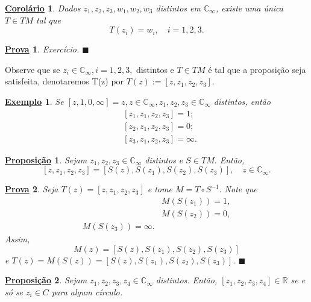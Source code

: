 \documentclass{article}
\newtheorem{example}{\underline{Exemplo}}[section]
\newtheorem*{proof*}{\underline{Prova}}
\newtheorem*{prop*}{\underline{Proposi\c c\~ao}}
\newtheorem*{crl*}{\underline{Corol\'ario}}
\renewcommand\qedsymbol{$\blacksquare$}
\begin{document}
 \begin{crl*}
   Dados $z_1, z_2, z_3, w_1, w_2, w_3$ distintos em $\mathbb{C}_{\infty}$, existe uma \'unica $T\in{TM}$ tal que
  $$
  T(z_{i}) = w_{i}, \quad i=1, 2, 3.
  $$
 \end{crl*}
\begin{proof*}
  Exerc\'icio. \qedsymbol
\end{proof*}
  Observe que se $z_{i}\in \mathbb{C}_{\infty}, i = 1, 2, 3,$ distintos e $T\in{TM}$ \'e tal que a proposi\c c\~ao
seja satisfeita, denotaremos T(z) por  $T(z) := [z, z_1, z_2, z_3].$
\begin{example}
  Se $[z, 1, 0, \infty] = z, z\in \mathbb{C}_{\infty}, z_1, z_2, z_3\in \mathbb{C}_{\infty}$ distintos, ent\~ao
  \begin{align*}
    &[z_1, z_1, z_2, z_3] = 1; \\
    &[z_2, z_1, z_2, z_3] = 0; \\
    &[z_3, z_1, z_2, z_3] = \infty.
  \end{align*}
\end{example}
\begin{prop*}
  Sejam $z_1, z_2, z_3\in \mathbb{C}_{\infty}$ distintos e $S\in{TM}.$ Ent\~ao, 
  $$
  [z, z_1, z_2, z_3] = [S(z), S(z_1), S(z_2), S(z_3)], \quad z\in \mathbb{C}_{\infty}.
  $$
\end{prop*}
\begin{proof*}
  Seja $T(z) = [z, z_1, z_2, z_3]$ e tome $M = T\circ{S^{-1}}.$ Note que 
 \begin{align*}
   &M(S(z_1)) = 1, \\
   &M(S(z_2)) = 0, \\
   M(S(z_3)) = \infty.
 \end{align*} 
 Assim, 
 $$
 M(z) = [S(z), S(z_1), S(z_2), S(z_3)]
 $$
 e $T(z) = M(S(z)) = [S(z), S(z_1), S(z_2), S(z_3)]$. \qedsymbol
\end{proof*}
\begin{prop*}
  Sejam $z_1, z_2, z_3, z_4\in \mathbb{C}_{\infty}$ distintos. Ent\~ao, $[z_1, z_2, z_3, z_4]\in \mathbb{R}$ se e s\'o se 
$z_{i}\in{C}$ para algum c\'irculo.
\end{prop*}
\end{document}
